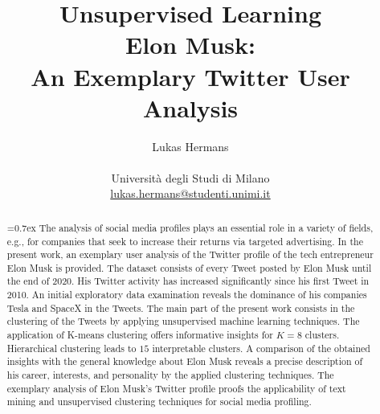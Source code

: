 \title{\large Unsupervised Learning \\ \LARGE
 Elon Musk:\\An Exemplary Twitter User Analysis}
\author{Lukas Hermans\\ \\
{Università degli Studi di Milano} \\
\href{mailto:lukas.hermans@studenti.unimi.it}
{lukas.hermans@studenti.unimi.it}}

\maketitle

\begin{abstract} 
\noindent
{}\font=0.7ex%
The analysis of social media profiles plays an essential role in a variety of fields, e.g., for companies that seek to increase their returns via targeted advertising. In the present work, an exemplary user analysis of the Twitter profile of the tech entrepreneur Elon Musk is provided. The dataset consists of every Tweet posted by Elon Musk until the end of 2020. His Twitter activity has increased significantly since his first Tweet in 2010. An initial exploratory data examination reveals the dominance of his companies Tesla and SpaceX in the Tweets. The main part of the present work consists in the clustering of the Tweets by applying unsupervised machine learning techniques. The application of K-means clustering offers informative insights for $K=8$ clusters. Hierarchical clustering leads to $15$ interpretable clusters. A comparison of the obtained insights with the general knowledge about Elon Musk reveals a precise description of his career, interests,  and personality by the applied clustering techniques. The exemplary analysis of Elon Musk's Twitter profile proofs the applicability of text mining and unsupervised clustering techniques for social media profiling. 
\end{abstract}
